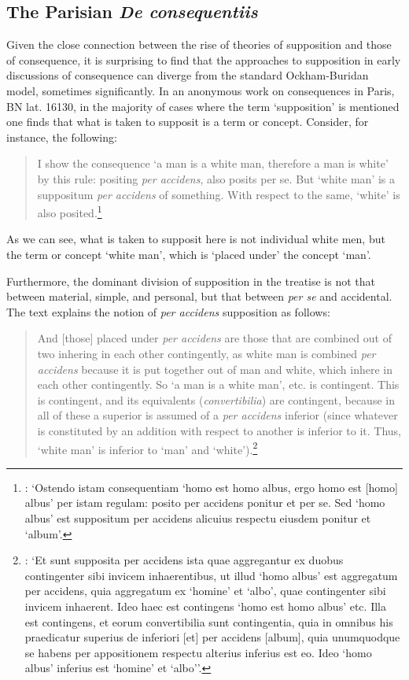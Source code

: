 \documentclass[a4paper, 11pt]{article}
\begin{document}
\subsection{The Parisian \emph{De consequentiis}}
Given the close connection between the rise of theories of supposition and those of consequence, it is surprising to find that the approaches to supposition in early discussions of consequence can diverge from the standard Ockham-Buridan model, sometimes significantly. In an anonymous work on consequences in Paris, BN lat. 16130, in the majority of cases where the term `supposition' is mentioned one finds that what is taken to supposit is a term or concept. Consider, for instance, the following:

\begin{quote}
I show the consequence `a man is a white man, therefore a man is white' by this rule: positing \emph{per accidens}, also posits per se. But `white man' is a suppositum \emph{per accidens} of something. With respect to the same, `white' is also posited.\footnote{\autocite[18, par. 34]{Green-Pedersen1980a}: `Ostendo istam consequentiam `homo est homo albus, ergo homo est [homo] albus' per istam regulam: posito per accidens ponitur et per se. Sed `homo albus' est suppositum per accidens alicuius respectu eiusdem ponitur et `album'.}
\end{quote}

As we can see, what is taken to supposit here is not individual white men, but the term or concept `white man', which is `placed under' the concept `man'. 

Furthermore, the dominant division of supposition in the treatise is not that between material, simple, and personal, but that between \emph{per se} and accidental. The text explains the notion of \emph{per accidens} supposition as follows:

\begin{quote}
And [those] placed under \emph{per accidens} are those that are combined out of two inhering in each other contingently, as white man is combined \emph{per accidens} because it is put together out of man and white, which inhere in each other contingently. So `a man is a white man', etc. is contingent. This is contingent, and its equivalents (\emph{convertibilia}) are contingent, because in all of these a superior is assumed of a \emph{per accidens} inferior (since whatever is constituted by an addition with respect to another is inferior to it. Thus, `white man' is inferior to `man' and `white').\footnote{\autocite[19, par. 38]{Green-Pedersen1980a}: `Et sunt supposita per accidens ista quae aggregantur ex duobus contingenter sibi invicem inhaerentibus, ut illud `homo albus' est aggregatum per accidens, quia aggregatum ex `homine' et `albo', quae contingenter sibi invicem inhaerent. Ideo haec est contingens `homo est homo albus' etc. Illa est contingens, et eorum convertibilia sunt contingentia, quia in omnibus his praedicatur superius de inferiori [et] per accidens [album], quia unumquodque se habens per appositionem respectu alterius inferius est eo. Ideo `homo albus' inferius est `homine' et `albo''.}
\end{quote}
\end{document}
